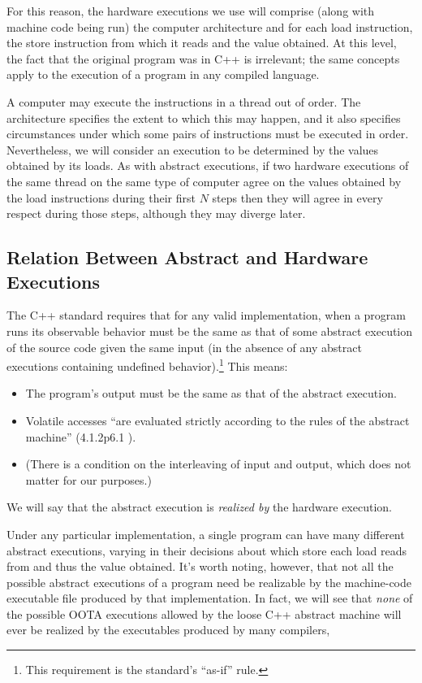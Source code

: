 \documentclass[10]{article}
\begin{document}
For this reason, the hardware executions we use will comprise (along
with machine code being run) the computer architecture and for each
load instruction, the store instruction from which it reads and the
value obtained.
At this level, the fact that the original program was in C++ is
irrelevant; the same concepts apply to the execution of a program in
any compiled language.

A computer may execute the instructions in a thread out of order.
The architecture specifies the extent to which this may happen, and it
also specifies circumstances under which some pairs of instructions
must be executed in order.
Nevertheless, we will consider an execution to be determined by the
values obtained by its loads.
As with abstract executions, if two hardware executions of the same
thread on the same type of computer agree on the values obtained by
the load instructions during their first $N$ steps then they will
agree in every respect during those steps, although they may diverge
later.

\subsection{Relation Between Abstract and Hardware Executions}
\label{sec:Relation Between Abstract and Hardware Executions}

The C++ standard requires that for any valid implementation, when a
program runs its observable behavior must be the same as that of some
abstract execution of the source code given the same input (in the
absence of any abstract executions containing undefined behavior).\footnote{
	This requirement is the standard's ``as-if'' rule.}
This means:
\begin{itemize}
\item	The program's output must be the same as that of the abstract
	execution.
\item	Volatile accesses ``are evaluated strictly according to the
	rules of the abstract machine'' (4.1.2p6.1 ).
\item	(There is a condition on the interleaving of input and output,
	which does not matter for our purposes.)
\end{itemize}
We will say that the abstract execution is \emph{realized by} the
hardware execution.

Under any particular implementation,
a single program can have many different abstract executions,
varying in their decisions about which store each load reads from
and thus the value obtained.
It's worth noting, however, that not all the possible abstract executions
of a program need be realizable by the machine-code executable file
produced by that implementation.
In fact, we will see that \emph{none} of the possible OOTA executions
allowed by the loose C++ abstract machine will ever be realized
by the executables produced by many compilers,
\end{document}
